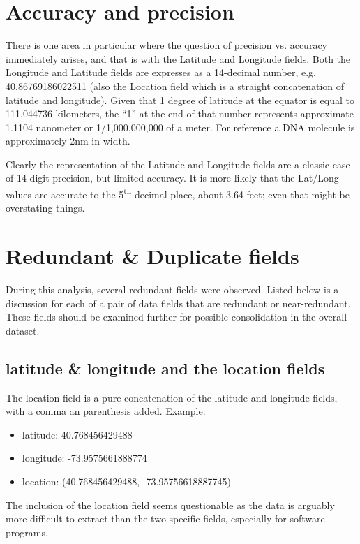 \documentclass[12pt, titlepage]{article}
\begin{document}
{\section{Accuracy and precision}\label{sec:precision}
There is one area in particular where the question of precision vs. accuracy immediately arises, and that is with the Latitude and Longitude fields.  Both the 
Longitude and Latitude fields are expresses as a 14-decimal number, e.g. 40.86769186022511 (also the Location field which is a straight concatenation of
latitude and longitude). Given that 1 degree of latitude at the equator is equal to 111.044736 kilometers, the ``1'' at the end of that number represents
approximate 1.1104 nanometer or 1/1,000,000,000 of a meter. For reference a DNA molecule is approximately 2nm in width. 

Clearly the representation of the Latitude and Longitude fields are a classic case of 14-digit precision, 
but limited accuracy. It is more likely that the Lat/Long values are accurate to the 5\textsuperscript{th} decimal place, about 3.64 feet; even that might be
overstating things. 



\section{Redundant \& Duplicate fields}\label{sec:duplicates}
During this analysis, several redundant fields were observed. Listed below is a discussion for each of a pair
of data fields that are redundant or near-redundant. These fields should be examined further for possible
consolidation in the overall dataset.

\subsection{latitude \& longitude and the location fields}  The location field is a pure concatenation of the latitude and longitude fields, 
with a comma an parenthesis added. Example:  

	\begin{itemize}
		\item  latitude: 40.768456429488
		\item  longitude: -73.9575661888774
		\item  location: (40.768456429488, -73.95756618887745)
	\end{itemize}

The inclusion of the location field seems questionable as the data is arguably more difficult to extract than the two specific fields, especially for
software programs.

}
\end{document}
